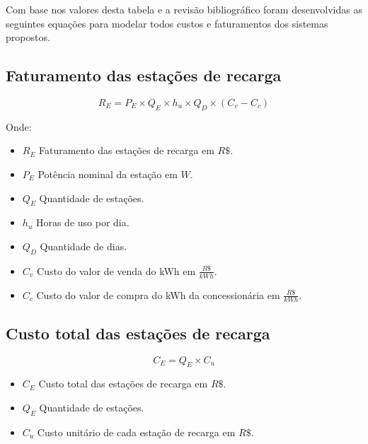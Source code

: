 Com base nos valores desta tabela e a revisão bibliográfico foram desenvolvidas as seguintes equações para modelar todos custos e faturamentos dos sistemas propostos.

\subsection{Faturamento das estações de recarga}

\begin{equation}
    R_{E} = P_{E} \times Q_{E} \times h_{u} \times Q_{D} \times (C_{v} - C_{c})
    \label{eq:EV_retorno}
\end{equation}

Onde:

\begin{itemize}
  \item $R_{E}$ Faturamento das estações de recarga em $R\$$.

  \item $P_{E}$ Potência nominal da estação em $W$.
  
  \item $Q_{E}$ Quantidade de estações.
  
  \item $h_{u}$ Horas de uso por dia.
  
  \item $Q_{D}$ Quantidade de dias.
  
  \item $C_{v}$ Custo do valor de venda do kWh em $\frac{R\$}{kWh}$.
  
  \item $C_{c}$ Custo do valor de compra do kWh da concessionária em $\frac{R\$}{kWh}$.
\end{itemize}



\subsection{Custo total das estações de recarga}

\begin{equation}
    C_{E} = Q_{E} \times C_{u}
    \label{eq:EV_custo}
\end{equation}

\begin{itemize}
  \item $C_{E}$ Custo total das estações de recarga em $R\$$.

  \item $Q_{E}$ Quantidade de estações.
  
  \item $C_{u}$ Custo unitário de cada estação de recarga em $R\$$.
\end{itemize}

